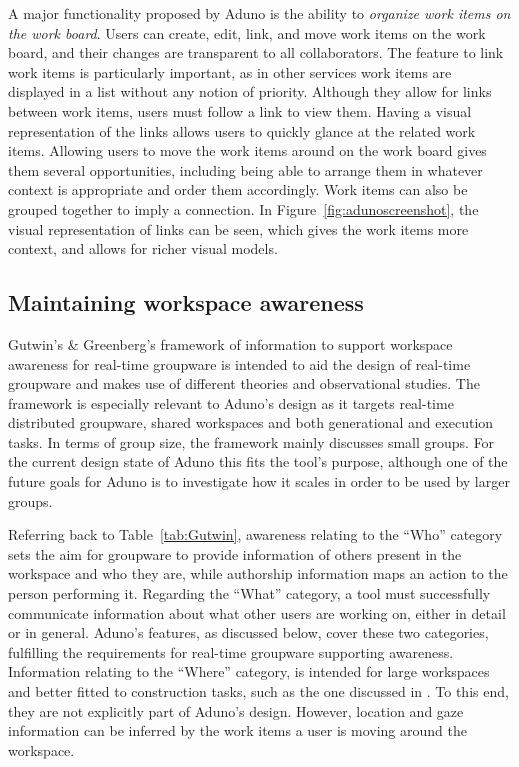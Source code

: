 \documentclass[conference]{IEEEtran}
\begin{document}
A major functionality proposed by Aduno is the ability to \textit{organize work items on the work board}. Users can create, edit, link, and move work items on the work board, and their changes are transparent to all collaborators. The feature to link work items is particularly important, as in other services work items are displayed in a list without any notion of priority. Although they allow for links between work items, users must follow a link to view them. Having a visual representation of the links allows users to quickly glance at the related work items. Allowing users to move the work items around on the work board gives them several opportunities, including being able to arrange them in whatever context is appropriate and order them accordingly. Work items can also be grouped together to imply a connection.  In Figure~\ref{fig:adunoscreenshot}, the visual representation of links can be seen, which gives the work items more context, and allows for richer visual models.  

\subsection{Maintaining workspace awareness}

Gutwin's \& Greenberg's \cite{GG02} framework of information to support workspace awareness for real-time groupware is intended to aid the design of real-time groupware and makes use of different theories and observational studies. The framework is especially relevant to Aduno's design as it targets real-time distributed groupware, shared workspaces and both generational and execution tasks. In terms of group size, the framework mainly discusses small groups. For the current design state of Aduno this fits the tool's purpose, although one of the future goals for Aduno is to investigate how it scales in order to be used by larger groups.

Referring back to Table~\ref{tab:Gutwin}, awareness relating to the ``Who'' category sets the aim for groupware to provide information of others present in the workspace and who they are, while authorship information maps an action to the person performing it. Regarding the ``What'' category, a tool must successfully communicate information about what other users are working on, either in detail or in general. Aduno's features, as discussed below, cover these two categories, fulfilling the requirements for real-time groupware supporting awareness. Information relating to the ``Where'' category, is intended for large workspaces and better fitted to construction tasks, such as the one discussed in \cite{GRG96}. To this end, they are not explicitly part of Aduno's design. However, location and gaze information can be inferred by the work items a user is moving around the workspace.
\end{document}
